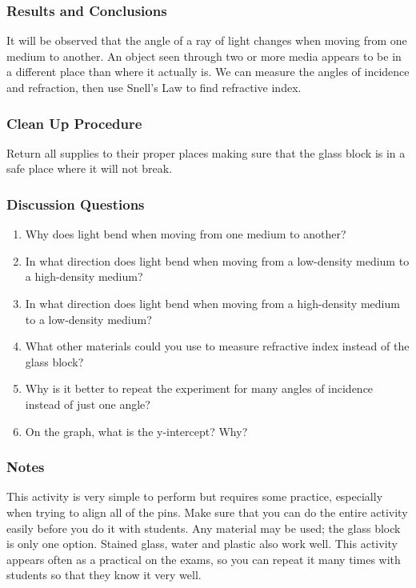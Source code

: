 \subsubsection*{Results and Conclusions}
It will be observed that the angle of a ray of light changes when moving from one medium to another.  An object seen through two or more media appears to be in a different place than where it actually is.  We can measure the angles of incidence and refraction, then use Snell's Law to find refractive index. 

\subsubsection*{Clean Up Procedure}
Return all supplies to their proper places making sure that the glass block is in a safe place where it will not break.

\subsubsection*{Discussion Questions}
\begin{enumerate}
\item{Why does light bend when moving from one medium to another?}
\item{In what direction does light bend when moving from a low-density medium to a high-density medium?}
\item{In what direction does light bend when moving from a high-density medium to a low-density medium?}
\item{What other materials could you use to measure refractive index instead of the glass block?}
\item{Why is it better to repeat the experiment for many angles of incidence instead of just one angle?}
\item{On the graph, what is the y-intercept? Why?}
\end{enumerate}

\subsubsection*{Notes}
This activity is very simple to perform but requires some practice, especially when trying to align all of the pins. Make sure that you can do the entire activity easily before you do it with students.  
Any material may be used; the glass block is only one option. Stained glass, water and plastic also work well.  
This activity appears often as a practical on the exams, so you can repeat it many times with students so that they know it very well.  

